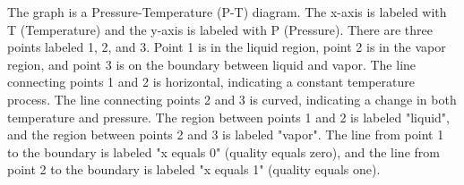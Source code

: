 The graph is a Pressure-Temperature (P-T) diagram. The x-axis is labeled with T (Temperature) and the y-axis is labeled with P (Pressure). There are three points labeled 1, 2, and 3. Point 1 is in the liquid region, point 2 is in the vapor region, and point 3 is on the boundary between liquid and vapor. The line connecting points 1 and 2 is horizontal, indicating a constant temperature process. The line connecting points 2 and 3 is curved, indicating a change in both temperature and pressure. The region between points 1 and 2 is labeled "liquid", and the region between points 2 and 3 is labeled "vapor". The line from point 1 to the boundary is labeled "x equals 0" (quality equals zero), and the line from point 2 to the boundary is labeled "x equals 1" (quality equals one).